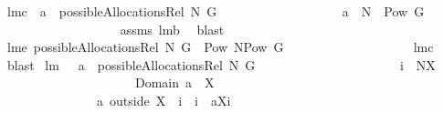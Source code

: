 \begin{isabellebody}
\endisadelimproof
\isanewline
{}\isamarkupfalse%
\ lm{}{}c{\isacharcolon}\ \ {\isachardoublequoteopen}a\ {\isasymin}\ possibleAllocationsRel\ N\ G{\isachardoublequoteclose}\ \isanewline
\ \ \ \ \ \ \ \ \ \ \ \ \ \ \ \ \ \ {\isachardoublequoteopen}a\ {\isasymsubseteq}\ N\ {\isasymtimes}\ {\isacharparenleft}Pow\ G\ {\isacharminus}\ {\isacharbraceleft}{\isacharbraceleft}{\isacharbraceright}{\isacharbraceright}{\isacharparenright}{\isachardoublequoteclose}\ \isanewline
%
\isadelimproof
\ \ \ \ \ \ \ \ \ \ \ \ \ \ \ \ \ %
\endisadelimproof
%
\isatagproof
{}\isamarkupfalse%
\ assms\ lm{}{}b\ \isamarkupfalse%
\ blast%
\endisatagproof
{\isafoldproof}%
%
\isadelimproof
\isanewline
%
\endisadelimproof
\isanewline
{}\isamarkupfalse%
\ lm{}{}e{\isacharcolon}\ {\isachardoublequoteopen}possibleAllocationsRel\ N\ G\ {\isasymsubseteq}\ Pow\ {\isacharparenleft}N{\isasymtimes}{\isacharparenleft}Pow\ G{\isacharminus}{\isacharbraceleft}{\isacharbraceleft}{\isacharbraceright}{\isacharbraceright}{\isacharparenright}{\isacharparenright}{\isachardoublequoteclose}\ \isanewline
%
\isadelimproof
\ \ \ \ \ \ \ \ \ \ \ \ \ \ \ \ \ %
\endisadelimproof
%
\isatagproof
{}\isamarkupfalse%
\ lm{}{}c\ \isamarkupfalse%
\ blast%
\endisatagproof
{\isafoldproof}%
%
\isadelimproof
\isanewline
%
\endisadelimproof
\isanewline
\isanewline
{}\isamarkupfalse%
\ lm{}{}{\isacharcolon}\ \ \ {\isachardoublequoteopen}a\ {\isasymin}\ possibleAllocationsRel\ N\ G{\isachardoublequoteclose}\ \isanewline
\ \ \ \ \ \ \ \ \ \ \ \ \ \ \ \ \ \ \ \ \ {\isachardoublequoteopen}i\ {\isasymin}\ N{\isacharminus}X{\isachardoublequoteclose}\ \isanewline
\ \ \ \ \ \ \ \ \ \ \ \ \ \ \ \ \ \ \ \ \ {\isachardoublequoteopen}Domain\ a\ {\isasyminter}\ X\ {\isasymnoteq}\ {\isacharbraceleft}{\isacharbraceright}{\isachardoublequoteclose}\ \isanewline
\ \ \ \ \ \ \ \ \ \ \ \ \ \ \ {\isachardoublequoteopen}a\ outside\ {\isacharparenleft}X\ {\isasymunion}\ {\isacharbraceleft}i{\isacharbraceright}{\isacharparenright}\ {\isasymunion}\ {\isacharparenleft}{\isacharbraceleft}i{\isacharbraceright}\ {\isasymtimes}\ {\isacharbraceleft}{\isasymUnion}{\isacharparenleft}a{\isacharbackquote}{\isacharbackquote}{\isacharparenleft}X{\isasymunion}{\isacharbraceleft}i{\isacharbraceright}{\isacharparenright}{\isacharparenright}{\isacharbraceright}{\isacharparenright}\ {\isasymin}\ \isanewline

\end{isabellebody}
